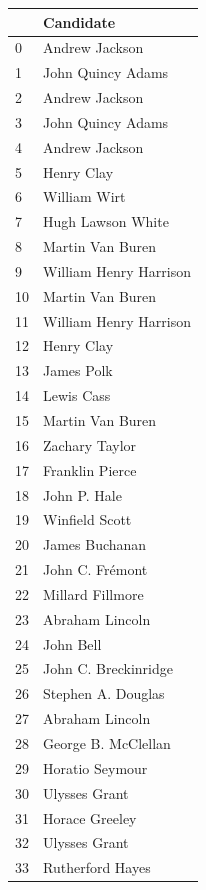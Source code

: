 \documentclass[
  letterpaper,
  DIV=11,
  numbers=noendperiod]{scrreprt}
\begin{document}
\begin{tabular}{ll}
\toprule
{} &               Candidate \\
\midrule
0   &          Andrew Jackson \\
1   &       John Quincy Adams \\
2   &          Andrew Jackson \\
3   &       John Quincy Adams \\
4   &          Andrew Jackson \\
5   &              Henry Clay \\
6   &            William Wirt \\
7   &       Hugh Lawson White \\
8   &        Martin Van Buren \\
9   &  William Henry Harrison \\
10  &        Martin Van Buren \\
11  &  William Henry Harrison \\
12  &              Henry Clay \\
13  &              James Polk \\
14  &              Lewis Cass \\
15  &        Martin Van Buren \\
16  &          Zachary Taylor \\
17  &         Franklin Pierce \\
18  &            John P. Hale \\
19  &          Winfield Scott \\
20  &          James Buchanan \\
21  &         John C. Frémont \\
22  &        Millard Fillmore \\
23  &         Abraham Lincoln \\
24  &               John Bell \\
25  &    John C. Breckinridge \\
26  &      Stephen A. Douglas \\
27  &         Abraham Lincoln \\
28  &     George B. McClellan \\
29  &         Horatio Seymour \\
30  &           Ulysses Grant \\
31  &          Horace Greeley \\
32  &           Ulysses Grant \\
33  &        Rutherford Hayes \\

\end{tabular}
\end{document}
